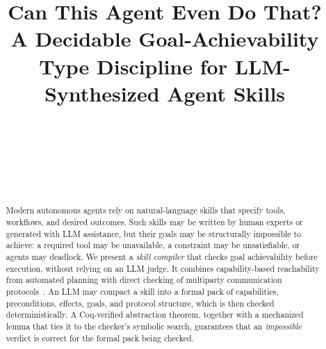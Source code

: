 \documentclass{article}
\title{Can This Agent Even Do That?\\
A Decidable Goal-Achievability Type Discipline for LLM-Synthesized Agent Skills}
\author{%
  \new{Tzu-Chun Chen}\\
  \new{Microsoft, ISD EAG}\\
  \new{\texttt{tzuchunchen@microsoft.com}}
  \And
  \new{Mariangiola Dezani-Ciancaglini}\\
  \new{Department of Computer Science}\\
  \new{University of Turin}\\
  \new{\texttt{dezani@di.unito.it}}
}
\theoremstyle{plain}
\theoremstyle{definition}
\newcommand{\bnew}{\begingroup\color{revblue}}
\newcommand{\bnew}{\begingroup}
\newcommand{\enew}{\endgroup}
\newcommand{\new}[1]{{\bnew #1\enew}}
\begin{document}
\maketitle

\begin{abstract}
Modern autonomous agents rely on natural-language skills that specify tools,
workflows, and desired outcomes. Such skills may be written by human experts or
generated with LLM assistance, but their goals may be structurally impossible
to achieve: a required tool may be unavailable, a constraint may be
unsatisfiable, or agents may deadlock. We present a \emph{skill compiler} that
checks goal achievability before execution, without relying on an LLM judge. It
combines capability-based reachability from automated planning with direct
checking of multiparty communication protocols~\cite{synthetic2023,synthetic2026}.
An LLM may compact a skill into a formal pack of capabilities, preconditions,
effects, goals, and protocol structure, which is then checked deterministically.
A Coq-verified abstraction theorem\new{, together with a mechanized lemma that
ties it to the checker's symbolic search,} guarantees that an \emph{impossible}
verdict is correct for the formal pack being checked.

\end{abstract}
\end{document}
